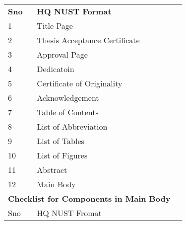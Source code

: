 \begin{table}[]
\begin{tabular}{lll}
\textbf{Sno}   & \multicolumn{2}{l}{\textbf{HQ NUST Format}}                                                                        \\
1              & Title Page                                                                                                      &  \\
2              & Thesis Acceptance   Certificate                                                                                 &  \\
3              & Approval Page                                                                                                   &  \\
4              & Dedicatoin                                                                                                      &  \\
5              & Certificate of   Originality                                                                                    &  \\
6              & Acknowledgement                                                                                                 &  \\
7              & Table of Contents                                                                                               &  \\
8              & List of Abbreviation                                                                                            &  \\
9              & List of Tables                                                                                                  &  \\
10             & List of Figures                                                                                                 &  \\
11             & Abstract                                                                                                        &  \\
12             & Main Body                                                                                                       &  \\
\multicolumn{2}{l}{\textbf{Checklist for Components in Main Body}}                                                               &  \\
Sno            & HQ NUST Fromat                                                                                                  &  \\

\end{tabular}
\end{table}
